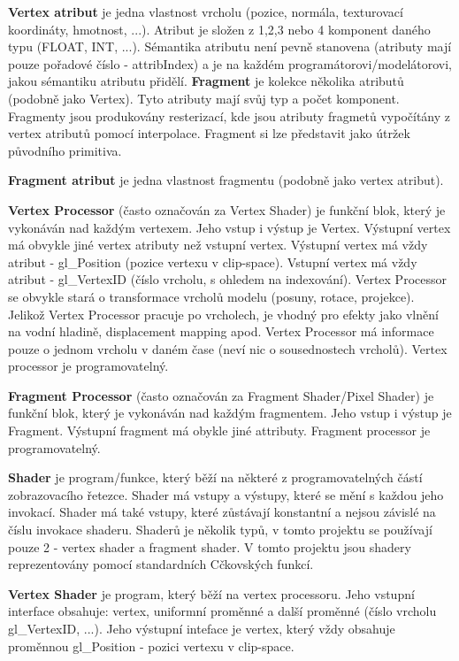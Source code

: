 {\bfseries Vertex atribut} je jedna vlastnost vrcholu (pozice, normála, texturovací koordináty, hmotnost, ...). Atribut je složen z 1,2,3 nebo 4 komponent daného typu (F\+L\+O\+AT, I\+NT, ...). Sémantika atributu není pevně stanovena (atributy mají pouze pořadové číslo -\/ attrib\+Index) a je na každém programátorovi/modelátorovi, jakou sémantiku atributu přidělí.  {\bfseries Fragment} je kolekce několika atributů (podobně jako Vertex). Tyto atributy mají svůj typ a počet komponent. Fragmenty jsou produkovány resterizací, kde jsou atributy fragmetů vypočítány z vertex atributů pomocí interpolace. Fragment si lze představit jako útržek původního primitiva.

{\bfseries Fragment atribut} je jedna vlastnost fragmentu (podobně jako vertex atribut).

{\bfseries Vertex Processor} (často označován za Vertex Shader) je funkční blok, který je vykonáván nad každým vertexem. Jeho vstup i výstup je Vertex. Výstupní vertex má obvykle jiné vertex atributy než vstupní vertex. Výstupní vertex má vždy atribut -\/ gl\+\_\+\+Position (pozice vertexu v clip-\/space). Vstupní vertex má vždy atribut -\/ gl\+\_\+\+Vertex\+ID (číslo vrcholu, s ohledem na indexování). Vertex Processor se obvykle stará o transformace vrcholů modelu (posuny, rotace, projekce). Jelikož Vertex Processor pracuje po vrcholech, je vhodný pro efekty jako vlnění na vodní hladině, displacement mapping apod. Vertex Processor má informace pouze o jednom vrcholu v daném čase (neví nic o sousednostech vrcholů). Vertex processor je programovatelný.

{\bfseries Fragment Processor} (často označován za Fragment Shader/\+Pixel Shader) je funkční blok, který je vykonáván nad každým fragmentem. Jeho vstup i výstup je Fragment. Výstupní fragment má obykle jiné attributy. Fragment processor je programovatelný.

{\bfseries Shader} je program/funkce, který běží na některé z programovatelných částí zobrazovacího řetezce. Shader má vstupy a výstupy, které se mění s každou jeho invokací. Shader má také vstupy, které zůstávají konstantní a nejsou závislé na číslu invokace shaderu. Shaderů je několik typů, v tomto projektu se používají pouze 2 -\/ vertex shader a fragment shader. V tomto projektu jsou shadery reprezentovány pomocí standardních Cčkovských funkcí.

{\bfseries Vertex Shader} je program, který běží na vertex processoru. Jeho vstupní interface obsahuje\+: vertex, uniformní proměnné a další proměnné (číslo vrcholu gl\+\_\+\+Vertex\+ID, ...). Jeho výstupní inteface je vertex, který vždy obsahuje proměnnou gl\+\_\+\+Position -\/ pozici vertexu v clip-\/space.

